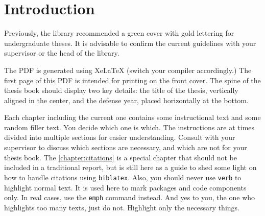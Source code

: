 \documentclass{iutbscthesis}
\begin{document}
\begin{abstract}
    Abstracts are crucial summaries of a thesis, balancing brevity and clarity while effectively conveying the study's essence. Despite their importance, many writers struggle with creating abstracts that are neither too vague nor overly detailed. This abstract tackles the challenge by offering a structured approach to abstract writing, breaking down the process into five essential components: Introduction, Problem, Proposed Solution, Results, and Conclusion. Using humorous examples, this abstract makes the abstract-writing process engaging and accessible. Our method demonstrates significant improvements in the quality and readability of abstracts, as the humor helps demystify and simplify the process. Ultimately, effective abstract writing is both an art and a science, requiring precision, audience awareness, and a touch of fun to make it approachable and enjoyable.
\end{abstract}


\chapter{Introduction}
Previously, the library recommended a green cover with gold lettering for undergraduate theses. It is advisable to confirm the current guidelines with your supervisor or the head of the library.

The PDF is generated using XeLaTeX (switch your compiler accordingly.) The first page of this PDF is intended for printing on the front cover. The spine of the thesis book should display two key details: the title of the thesis, vertically aligned in the center, and the defense year, placed horizontally at the bottom.

Each chapter including the current one contains some instructional text and some random filler text. You decide which one is which. The instructions are at times divided into multiple sections for easier understanding. Consult with your supervisor to discuss which sections are necessary, and which are not for your thesis book. The \autoref{chapter:citations} is a special chapter that should not be included in a traditional report, but is still here as a guide to shed some light on how to handle citations using \verb|biblatex|. Also, you should never use \texttt{verb} to highlight normal text. It is used here to mark packages and code components only. In real cases, use the \verb|emph| command instead. And yes to you, the one who highlights too many texts, just do not. Highlight only the necessary things.
\end{document}
